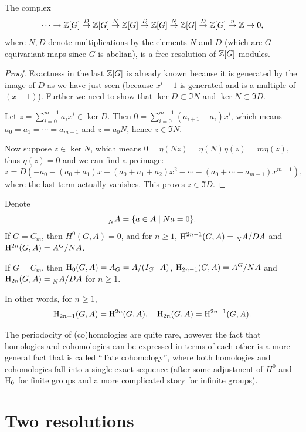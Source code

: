 \begin{thm}
    The complex
    \[\cdots\to \mathbb{Z}[G]\overset{D}{\to} \mathbb{Z}[G]\overset{N}{\to}\mathbb{Z}[G]\overset{D}{\to}\mathbb{Z}[G]\overset{N}{\to}\mathbb{Z}[G]\overset{D}{\to}\mathbb{Z}[G]\overset{\eta}{\to}\mathbb{Z}\to 0,\]
    where $N,D$ denote multiplications by the elements $N$ and $D$ (which are $G$-equivariant maps since $G$ is abelian), is a free resolution of $\mathbb{Z}[G]$-modules.
\end{thm}
\begin{proof}
    Exactness in the last $\mathbb{Z}[G]$ is already known because it is generated by the image of $D$ as we have just seen (because $x^i-1$ is generated and is a multiple of $(x-1)$). Further we need to show that $\ker D\subset \Im N$ and $\ker N\subset \Im D$. 

    Let $z=\sum_{i=0}^{m-1}a_ix^i\in\ker D$. Then $0=\sum_{i=0}^{m-1}(a_{i+1}-a_i)x^i$, which means $a_0=a_1=\cdots=a_{m-1}$ and $z=a_0 N$, hence $z\in \Im N$.

    Now suppose $z\in \ker N$, which means $0=\eta(Nz)=\eta(N)\eta(z)=m\eta(z)$, thus $\eta(z)=0$ and we can find a preimage:
    \[z=D(-a_0-(a_0+a_1)x-(a_0+a_1+a_2)x^2-\cdots -(a_0+\cdots +a_{m-1})x^{m-1}),\]
    where the last term actually vanishes. This proves $z\in \Im D$.
\end{proof}
\begin{cor}
    Denote
    \[\prescript{}{N}{A}=\{a\in A\mid Na=0\}.\]
    If $G=C_m$, then $H^0(G,A)=0$, and for $n\geq 1$, $\mathrm{H}^{2n-1}(G,A)=\prescript{}{N}{A}\slash DA$ and $\mathrm{H}^{2n}(G,A)=A^G\slash NA$.
\end{cor}
\begin{cor}
    If $G=C_m$, then $\mathrm{H}_0(G,A)=A_G=A\slash (I_G\cdot A)$, $\mathrm{H}_{2n-1}(G,A)=A^G\slash NA$ and $\mathrm{H}_{2n}(G,A)=\prescript{}{N}{A}\slash DA$ for $n\geq 1$.

    In other words, for $n\geq 1$,
    \[\mathrm{H}_{2n-1}(G,A)=\mathrm{H}^{2n}(G,A),\quad \mathrm{H}_{2n}(G,A)=\mathrm{H}^{2n-1}(G,A).\]
\end{cor}
\begin{rem}
    The periodocity of (co)homologies are quite rare, however the fact that homologies and cohomologies can be expressed in terms of each other is a more general fact that is called ``Tate cohomology'', where both homologies and cohomologies fall into a single exact sequence (after some adjustment of $H^0$ and $\mathrm{H}_0$ for finite groups and a more complicated story for infinite groups). 
\end{rem}


\section{Two resolutions}

